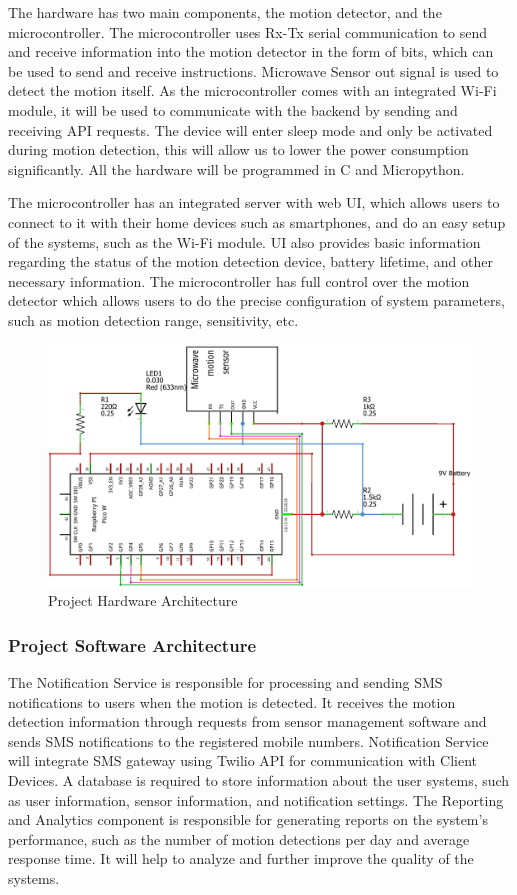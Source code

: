 \documentclass[conference]{IEEEtran}
\begin{document}
The hardware has two main components, the motion detector, and the microcontroller.
The microcontroller uses Rx-Tx serial communication to send and receive information
into the motion detector in the form of bits, which can be used to send and receive
instructions. Microwave Sensor out signal is used to detect the motion itself.
As the microcontroller comes with an integrated Wi-Fi module, it will be used to
communicate with the backend by sending and receiving API requests.
The device will enter sleep mode and only be activated during motion detection,
this will allow us to lower the power consumption significantly.
All the hardware will be programmed in C and Micropython.

The microcontroller has an integrated server with web UI, which allows users
to connect to it with their home devices such as smartphones, and do an easy setup
of the systems, such as the Wi-Fi module. UI also provides basic information regarding
the status of the motion detection device, battery lifetime, and other necessary
information. The microcontroller has full control over the motion detector which
allows users to do the precise configuration of system parameters, such as motion
detection range, sensitivity, etc.

\begin{figure}[htbp]
      \centering
      \includegraphics[width=0.8\linewidth]{hardwareArchitecture.jpg}
      \caption{Project Hardware Architecture}
      \label{fig:hardwareArchitecture}
\end{figure}

\subsubsection{Project Software Architecture}

The Notification Service is responsible for processing and sending SMS notifications
to users when the motion is detected. It receives the motion detection information
through requests from sensor management software and sends SMS notifications to the
registered mobile numbers. Notification Service will integrate SMS gateway using
Twilio API for communication with Client Devices. A database is required to store
information about the user systems, such as user information, sensor information,
and notification settings. The Reporting and Analytics component is responsible
for generating reports on the system’s performance, such as the number of motion
detections per day and average response time. It will help to analyze and further
improve the quality of the systems.
\end{document}
